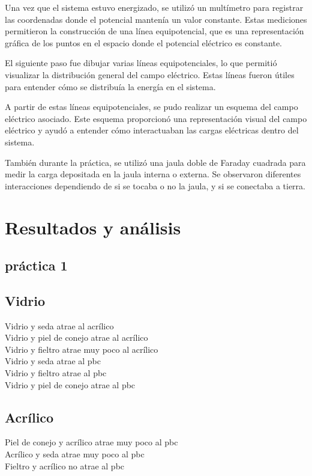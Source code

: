 \documentclass{article}
\begin{document}
\begin{multicols}{2}
Una vez que el sistema estuvo energizado, se utilizó un multímetro para registrar las coordenadas donde el potencial mantenía un valor constante. Estas mediciones permitieron la construcción de una línea equipotencial, que es una representación gráfica de los puntos en el espacio donde el potencial eléctrico es constante.

El siguiente paso fue dibujar varias líneas equipotenciales, lo que permitió visualizar la distribución general del campo eléctrico. Estas líneas fueron útiles para entender cómo se distribuía la energía en el sistema.

A partir de estas líneas equipotenciales, se pudo realizar un esquema del campo eléctrico asociado. Este esquema proporcionó una representación visual del campo eléctrico y ayudó a entender cómo interactuaban las cargas eléctricas dentro del sistema.

También durante la práctica, se utilizó una jaula doble de Faraday cuadrada para medir la carga depositada en la jaula interna o externa. Se observaron diferentes interacciones dependiendo de si se tocaba o no la jaula, y si se conectaba a tierra.


\end{multicols}
\section{Resultados y análisis}\label{Resultados}			%
\subsection{práctica 1}\label{p1}
	\subsection*{Vidrio}
  Vidrio y seda atrae al acrílico\\ 
	Vidrio y piel de conejo atrae al acrílico\\ 
	Vidrio y fieltro atrae muy poco al acrílico\\ 
	Vidrio y seda atrae al pbc\\
	Vidrio y fieltro atrae al pbc\\
	Vidrio y piel de conejo atrae al pbc

	\subsection*{Acrílico}
	Piel de conejo y acrílico atrae muy poco al pbc\\
	Acrílico y seda atrae muy poco al pbc\\
	Fieltro y acrílico no atrae al pbc
\end{document}
